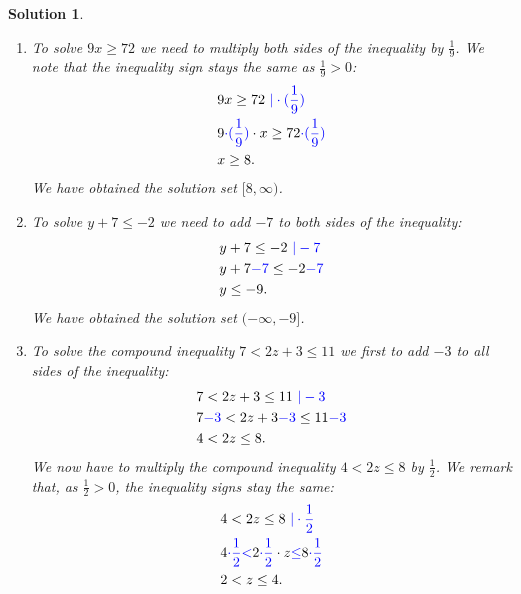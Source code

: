 \documentclass[12pt]{article}
\newtheorem{sol}[prop]{Solution}
\begin{document}
\begin{sol}
\begin{enumerate}
\item[a)] To solve $9x\geq 72$ we need to multiply both sides of the inequality by $\frac{1}{9}$. We note that the inequality sign stays the same as $\frac{1}{9}>0$:
\begin{equation*}
\begin{split}
& 9x\geq 72 \textcolor{blue}{\ |\cdot (\frac{1}{9})}\\
& 9\textcolor{blue}{\cdot (\frac{1}{9})}\cdot x\geq 72\textcolor{blue}{\cdot (\frac{1}{9})}\\
&x\geq 8.
\end{split}
\end{equation*}
We have obtained the solution set $[8, \infty)$.
\item[b)] To solve $y+7\leq -2$ we need to add $-7$ to both sides of the inequality:
\begin{equation*}
\begin{split}
& y+7\leq -2 \textcolor{blue}{\ |-7}\\
& y+7\textcolor{blue}{-7}\leq -2\textcolor{blue}{-7}\\
&y\leq -9.
\end{split}
\end{equation*}
We have obtained the solution set $(-\infty, -9]$.
\item[c)] To solve the compound inequality $7<2z+3\leq 11$ we first to add $-3$ to all sides of the inequality:
\begin{equation*}
\begin{split}
& 7<2z+3\leq 11 \textcolor{blue}{\ |-3}\\
& 7\textcolor{blue}{-3}<2z+3\textcolor{blue}{-3}\leq 11\textcolor{blue}{-3}\\
&4<2z\leq 8.
\end{split}
\end{equation*}
We now have to multiply the compound inequality $4<2z\leq 8$ by $\frac{1}{2}$. We remark that, as $\frac{1}{2}>0$, the inequality signs stay the same:
\begin{equation*}
\begin{split}
& 4<2z\leq 8 \textcolor{blue}{\ |\cdot \frac{1}{2}}\\
& 4\textcolor{blue}{\cdot \frac{1}{2}}\textcolor{blue}{<}2\textcolor{blue}{\cdot \frac{1}{2}}\cdot z\textcolor{blue}{\leq} 8\textcolor{blue}{\cdot \frac{1}{2}}\\
&2<z\leq 4.
\end{split}

\end{equation*}
\end{enumerate}
\end{sol}
\end{document}
